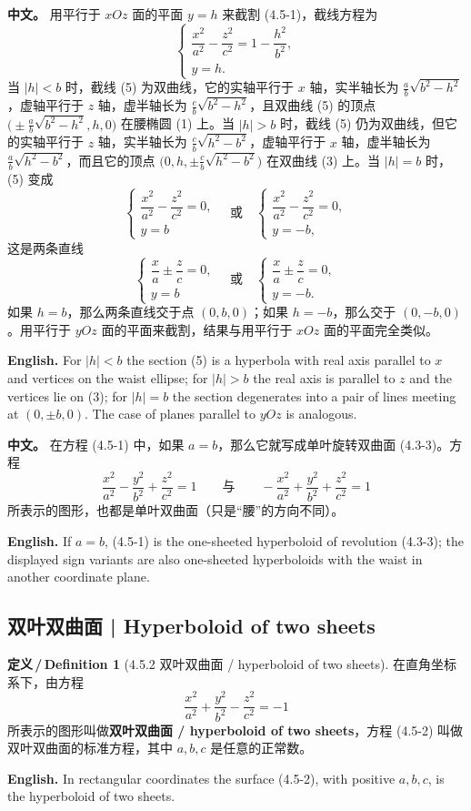 \documentclass[UTF8,11pt,a4paper]{ctexart}
\newcommand{\APS}[2]{\par\noindent\textbf{中文。} #1\par\noindent\textbf{English.} #2\par\smallskip}
\newcommand{\EN}[1]{\par\noindent \textbf{English.} #1\par}
\theoremstyle{definition}
\newtheorem*{definition}{定义\,/\,Definition}
\begin{document}
\APS{用平行于 $xOz$ 面的平面 $y=h$ 来截割 (4.5-1)，截线方程为
\[
\begin{cases}\dfrac{x^2}{a^2}-\dfrac{z^2}{c^2}=1-\dfrac{h^2}{b^2},\\ y=h.\end{cases}\tag{5}
\]
当 $|h|<b$ 时，截线 (5) 为双曲线，它的实轴平行于 $x$ 轴，实半轴长为 $\frac{a}{b}\sqrt{b^2-h^2}$，虚轴平行于 $z$ 轴，虚半轴长为 $\frac{c}{b}\sqrt{b^2-h^2}$，且双曲线 (5) 的顶点 $\bigl(\pm\frac{a}{b}\sqrt{b^2-h^2},h,0\bigr)$ 在腰椭圆 (1) 上。当 $|h|>b$ 时，截线 (5) 仍为双曲线，但它的实轴平行于 $z$ 轴，实半轴长为 $\frac{c}{b}\sqrt{h^2-b^2}$，虚轴平行于 $x$ 轴，虚半轴长为 $\frac{a}{b}\sqrt{h^2-b^2}$，而且它的顶点 $\bigl(0,h,\pm\frac{c}{b}\sqrt{h^2-b^2}\bigr)$ 在双曲线 (3) 上。当 $|h|=b$ 时，(5) 变成
\[
\begin{cases}\dfrac{x^2}{a^2}-\dfrac{z^2}{c^2}=0,\\ y=b\end{cases}\quad\text{或}\quad
\begin{cases}\dfrac{x^2}{a^2}-\dfrac{z^2}{c^2}=0,\\ y=-b,\end{cases}
\]
这是两条直线
\[
\begin{cases}\dfrac{x}{a}\pm\dfrac{z}{c}=0,\\ y=b\end{cases}\quad\text{或}\quad
\begin{cases}\dfrac{x}{a}\pm\dfrac{z}{c}=0,\\ y=-b.\end{cases}
\]
如果 $h=b$，那么两条直线交于点 $(0,b,0)$；如果 $h=-b$，那么交于 $(0,-b,0)$。用平行于 $yOz$ 面的平面来截割，结果与用平行于 $xOz$ 面的平面完全类似。}{For $|h|<b$ the section (5) is a hyperbola with real axis parallel to $x$ and vertices on the waist ellipse; for $|h|>b$ the real axis is parallel to $z$ and the vertices lie on (3); for $|h|=b$ the section degenerates into a pair of lines meeting at $(0,\pm b,0)$. The case of planes parallel to $yOz$ is analogous.}

\APS{在方程 (4.5-1) 中，如果 $a=b$，那么它就写成单叶旋转双曲面 (4.3-3)。方程
\[
\frac{x^2}{a^2}-\frac{y^2}{b^2}+\frac{z^2}{c^2}=1\qquad\text{与}\qquad-\frac{x^2}{a^2}+\frac{y^2}{b^2}+\frac{z^2}{c^2}=1
\]
所表示的图形，也都是单叶双曲面（只是``腰''的方向不同）。}{If $a=b$, (4.5-1) is the one-sheeted hyperboloid of revolution (4.3-3); the displayed sign variants are also one-sheeted hyperboloids with the waist in another coordinate plane.}

\subsection{双叶双曲面 | Hyperboloid of two sheets}
\begin{definition}[4.5.2 双叶双曲面 / hyperboloid of two sheets]\label{def:two-sheet}
在直角坐标系下，由方程
\[
\frac{x^2}{a^2}+\frac{y^2}{b^2}-\frac{z^2}{c^2}=-1\tag{4.5-2}
\]
所表示的图形叫做\textbf{双叶双曲面 / hyperboloid of two sheets}，方程 (4.5-2) 叫做双叶双曲面的标准方程，其中 $a,b,c$ 是任意的正常数。
\EN{In rectangular coordinates the surface (4.5-2), with positive $a,b,c$, is the hyperboloid of two sheets.}
\end{definition}
\end{document}
